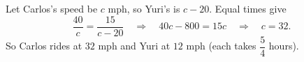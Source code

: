 Let Carlos's speed be $c$ mph, so Yuri's is $c-20$. Equal times give
\[
\dfrac{40}{c}=\dfrac{15}{c-20}\quad\Longrightarrow\quad 40c-800=15c\quad\Longrightarrow\quad c=32 .
\]
So Carlos rides at $\boxed{32\text{ mph}}$ and Yuri at $\boxed{12\text{ mph}}$ (each takes $\dfrac{5}{4}$ hours).
